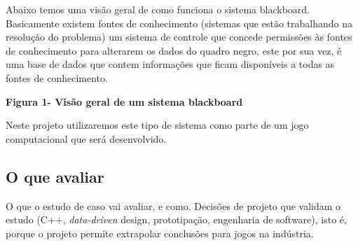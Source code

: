 Abaixo temos uma visão geral de como funciona o sistema blackboard. Basicamente existem fontes de conhecimento (sistemas que estão trabalhando na resolução do problema) um sistema de controle que concede permissões às fontes de conhecimento para alterarem os dados do quadro negro, este por sua vez, é uma base de dados que contem informações que ficam disponíveis a todas as fontes de conhecimento.

\textbf{Figura 1- Visão geral de um sistema blackboard}
	
Neste projeto utilizaremos este tipo de sistema como parte de um jogo computacional que será desenvolvido.


\subsection{O que avaliar}

O que o estudo de caso vai avaliar, e como. Decisões de projeto que
validam o estudo (C++, \emph{data-driven} design, prototipação,
engenharia de software), isto é, porque o projeto permite extrapolar
conclusões para jogos na indústria.
